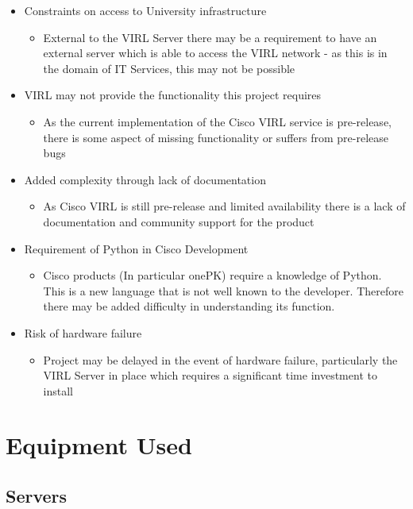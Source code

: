 \documentclass[11pt]{report}
\begin{document}
\begin{itemize}
  \item{Constraints on access to University infrastructure}
  \begin{itemize}
    \item{External to the VIRL Server there may be a requirement to have an external server which is able to access the VIRL network - as this is in the domain of IT Services, this may not be possible}
  \end{itemize}
  \item{VIRL may not provide the functionality this project requires}
  \begin{itemize}
    \item{As the current implementation of the Cisco VIRL service is pre-release, there is some aspect of missing functionality or suffers from pre-release bugs}
  \end{itemize}
  \item{Added complexity through lack of documentation}
  \begin{itemize}
    \item{As Cisco VIRL is still pre-release and limited availability there is a lack of documentation and community support for the product}
  \end{itemize}
  \item{Requirement of Python in Cisco Development}
  \begin{itemize}
    \item{Cisco products (In particular onePK) require a knowledge of Python. This is a new language that is not well known to the developer. Therefore there may be added difficulty in understanding its function.}
  \end{itemize}
  \item{Risk of hardware failure}
  \begin{itemize}
    \item{Project may be delayed in the event of hardware failure, particularly the VIRL Server in place which requires a significant time investment to install}
  \end{itemize}
\end{itemize}

\section{Equipment Used}


\subsection{Servers}
\end{document}
